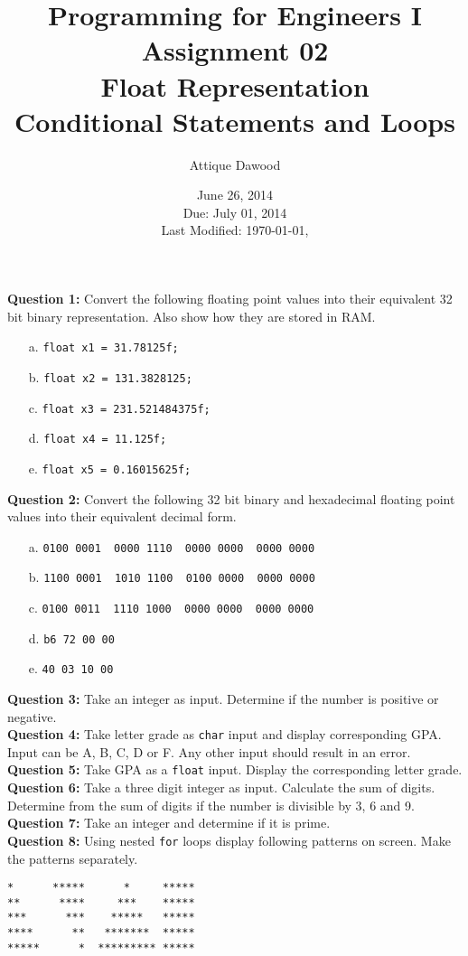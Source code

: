 \documentclass[12pt,a4paper]{article}
\title{Programming for Engineers I\\Assignment 02\\Float Representation\\Conditional Statements and Loops}
\author{Attique Dawood}
\date{June 26, 2014\\Due: July 01, 2014\\[0.2cm] Last Modified: \today, \currenttime}
\begin{document}
\maketitle
\noindent\textbf{Question 1:} Convert the following floating point values into their equivalent 32 bit binary representation. Also show how they are stored in RAM.
\begin{enumerate}
\item[a.] \verb|float x1 = 31.78125f;|
\item[b.] \verb|float x2 = 131.3828125;|
\item[c.] \verb|float x3 = 231.521484375f;|
\item[d.] \verb|float x4 = 11.125f;|
\item[e.] \verb|float x5 = 0.16015625f;|
\end{enumerate}
\noindent\textbf{Question 2:} Convert the following 32 bit binary and hexadecimal floating point values into their equivalent decimal form.
\begin{enumerate}
\item[a.] \verb|0100 0001  0000 1110  0000 0000  0000 0000|
\item[b.] \verb|1100 0001  1010 1100  0100 0000  0000 0000|
\item[c.] \verb|0100 0011  1110 1000  0000 0000  0000 0000|
\item[d.] \verb|b6 72 00 00|
\item[e.] \verb|40 03 10 00|
\end{enumerate}
\noindent\textbf{Question 3:} Take an integer as input. Determine if the number is positive or negative.\\
\noindent\textbf{Question 4:} Take letter grade as \verb|char| input and display corresponding GPA. Input can be A, B, C, D or F. Any other input should result in an error.\\
\noindent\textbf{Question 5:} Take GPA as a \verb|float| input. Display the corresponding letter grade.\\
\noindent\textbf{Question 6:} Take a three digit integer as input. Calculate the sum of digits. Determine from the sum of digits if the number is divisible by 3, 6 and 9.\\
\noindent\textbf{Question 7:} Take an integer and determine if it is prime.\\
\noindent\textbf{Question 8:} Using nested \verb|for| loops display following patterns on screen. Make the patterns separately.
\begin{lstlisting}
*      *****      *     *****
**      ****     ***    *****
***      ***    *****   *****
****      **   *******  *****
*****      *  ********* *****
\end{lstlisting}
\end{document}
